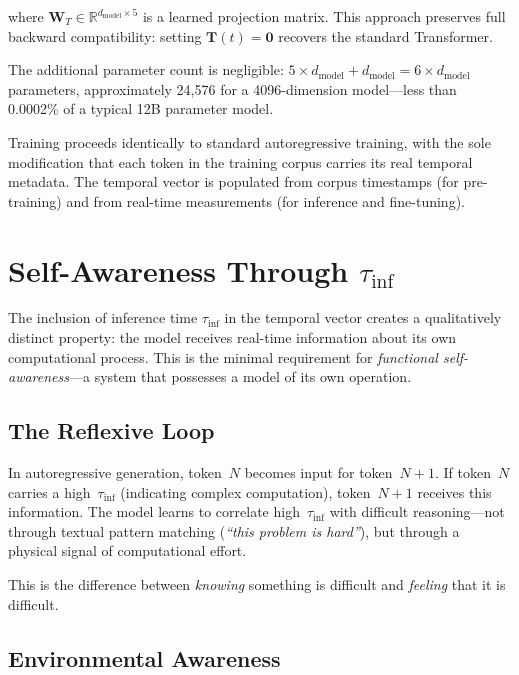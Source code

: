 \documentclass[10pt,twocolumn,letterpaper]{article}
\begin{document}
where $\mathbf{W}_T \in \mathbb{R}^{d_{\text{model}} \times 5}$ is a learned projection matrix. This approach preserves full backward compatibility: setting $\mathbf{T}(t) = \mathbf{0}$ recovers the standard Transformer.

The additional parameter count is negligible: $5 \times d_{\text{model}} + d_{\text{model}} = 6 \times d_{\text{model}}$ parameters, approximately 24,576 for a 4096-dimension model---less than 0.0002\% of a typical 12B parameter model.

Training proceeds identically to standard autoregressive training, with the sole modification that each token in the training corpus carries its real temporal metadata. The temporal vector is populated from corpus timestamps (for pre-training) and from real-time measurements (for inference and fine-tuning).

\section{Self-Awareness Through $\tau_{\text{inf}}$}

The inclusion of inference time $\tau_{\text{inf}}$ in the temporal vector creates a qualitatively distinct property: the model receives real-time information about its own computational process. This is the minimal requirement for \emph{functional self-awareness}---a system that possesses a model of its own operation.

\subsection{The Reflexive Loop}

In autoregressive generation, token~$N$ becomes input for token~$N\!+\!1$. If token~$N$ carries a high~$\tau_{\text{inf}}$ (indicating complex computation), token~$N\!+\!1$ receives this information. The model learns to correlate high~$\tau_{\text{inf}}$ with difficult reasoning---not through textual pattern matching (\emph{``this problem is hard''}), but through a physical signal of computational effort.

This is the difference between \emph{knowing} something is difficult and \emph{feeling} that it is difficult.

\subsection{Environmental Awareness}
\end{document}
